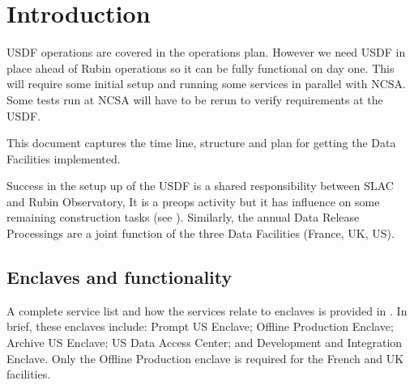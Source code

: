 \section{Introduction}
USDF operations are covered in the operations plan.
However we need \gls{USDF} in place ahead of Rubin  operations so it
can be fully functional on day one.
This will require some initial setup and running some services in parallel with \gls{NCSA}.
Some tests  run at NCSA will have to be rerun to verify requirements at the \gls{USDF}.

This document captures the time line, structure and plan for getting the Data Facilities implemented.

Success in the setup up of the \gls{USDF} is a shared responsibility between SLAC and Rubin Observatory,
It is a preops activity but it has influence on some remaining
construction tasks (see ). Similarly, the annual
Data Release Processings are a joint function of the three Data
Facilities (France, UK, US).

\subsection{Enclaves and functionality}\label{sec:enclaves}

A complete service list  and how the services relate to enclaves is provided in
. In brief, these enclaves include: Prompt US
Enclave; Offline Production Enclave; Archive US Enclave; US Data
Access Center; and Development and Integration Enclave. Only the
Offline Production enclave is required for the French and UK facilities.
